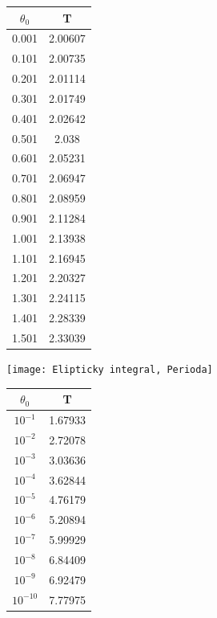 \documentclass[reqno, a4paper]{amsart}
\begin{document}
		\vspace{5mm}
		\begin{minipage}{\textwidth}
			\begin{minipage}[b]{0.25\textwidth}
				\centering
				\begin{tabular}{|c|c|}
					\hline
					$\theta_{0}$ & T \\ 
					\hline
					0.001& 2.00607\\0.101& 2.00735\\0.201& 2.01114\\0.301& 2.01749\\0.401& 2.02642\\0.501& 2.038\\0.601& 2.05231\\0.701& 2.06947\\0.801& 2.08959\\0.901& 2.11284\\
					1.001& 2.13938\\1.101& 2.16945\\1.201& 2.20327\\1.301& 2.24115\\1.401& 2.28339\\1.501& 2.33039\\
					\hline
				\end{tabular}
			\end{minipage}
			\begin{minipage}[b]{0.79\textwidth}
				\centering
				\texttt{[image: Elipticky integral, Perioda]}
			\end{minipage}
			\hfill
		\end{minipage}
	\begin{table}
		\begin{minipage}{\textwidth}
			\begin{minipage}[b]{0.25\textwidth}
				\centering
				\begin{tabular}{|c|c|}
					\hline
					$\theta_{0}$ & T \\ 
					\hline
					$ 10^{-1} $& 1.67933\\$ 10^{-2} $& 2.72078\\$ 10^{-3} $& 3.03636\\$ 10^{-4} $& 3.62844\\$ 10^{-5} $& 4.76179\\$ 10^{-6} $& 5.20894\\$ 10^{-7} $& 5.99929\\$ 10^{-8} $& 6.84409\\$ 10^{-9} $& 6.92479\\$ 10^{-10} $& 7.77975\\
					\hline
				\end{tabular}
			\end{minipage}
			\hfill
		\end{minipage}
	\end{table}
	
\end{document}

